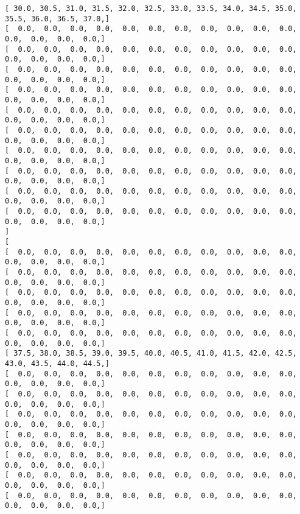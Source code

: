 \documentclass[11pt]{article}
\begin{document}
\begin{Verbatim}[commandchars=\\\{\}]
[  30.0,  30.5,  31.0,  31.5,  32.0,  32.5,  33.0,  33.5,  34.0,  34.5,  35.0,  35.5,  36.0,  36.5,  37.0, ]
[   0.0,   0.0,   0.0,   0.0,   0.0,   0.0,   0.0,   0.0,   0.0,   0.0,   0.0,   0.0,   0.0,   0.0,   0.0, ]
[   0.0,   0.0,   0.0,   0.0,   0.0,   0.0,   0.0,   0.0,   0.0,   0.0,   0.0,   0.0,   0.0,   0.0,   0.0, ]
[   0.0,   0.0,   0.0,   0.0,   0.0,   0.0,   0.0,   0.0,   0.0,   0.0,   0.0,   0.0,   0.0,   0.0,   0.0, ]
[   0.0,   0.0,   0.0,   0.0,   0.0,   0.0,   0.0,   0.0,   0.0,   0.0,   0.0,   0.0,   0.0,   0.0,   0.0, ]
[   0.0,   0.0,   0.0,   0.0,   0.0,   0.0,   0.0,   0.0,   0.0,   0.0,   0.0,   0.0,   0.0,   0.0,   0.0, ]
[   0.0,   0.0,   0.0,   0.0,   0.0,   0.0,   0.0,   0.0,   0.0,   0.0,   0.0,   0.0,   0.0,   0.0,   0.0, ]
[   0.0,   0.0,   0.0,   0.0,   0.0,   0.0,   0.0,   0.0,   0.0,   0.0,   0.0,   0.0,   0.0,   0.0,   0.0, ]
[   0.0,   0.0,   0.0,   0.0,   0.0,   0.0,   0.0,   0.0,   0.0,   0.0,   0.0,   0.0,   0.0,   0.0,   0.0, ]
[   0.0,   0.0,   0.0,   0.0,   0.0,   0.0,   0.0,   0.0,   0.0,   0.0,   0.0,   0.0,   0.0,   0.0,   0.0, ]
[   0.0,   0.0,   0.0,   0.0,   0.0,   0.0,   0.0,   0.0,   0.0,   0.0,   0.0,   0.0,   0.0,   0.0,   0.0, ]
]
[
[   0.0,   0.0,   0.0,   0.0,   0.0,   0.0,   0.0,   0.0,   0.0,   0.0,   0.0,   0.0,   0.0,   0.0,   0.0, ]
[   0.0,   0.0,   0.0,   0.0,   0.0,   0.0,   0.0,   0.0,   0.0,   0.0,   0.0,   0.0,   0.0,   0.0,   0.0, ]
[   0.0,   0.0,   0.0,   0.0,   0.0,   0.0,   0.0,   0.0,   0.0,   0.0,   0.0,   0.0,   0.0,   0.0,   0.0, ]
[   0.0,   0.0,   0.0,   0.0,   0.0,   0.0,   0.0,   0.0,   0.0,   0.0,   0.0,   0.0,   0.0,   0.0,   0.0, ]
[   0.0,   0.0,   0.0,   0.0,   0.0,   0.0,   0.0,   0.0,   0.0,   0.0,   0.0,   0.0,   0.0,   0.0,   0.0, ]
[  37.5,  38.0,  38.5,  39.0,  39.5,  40.0,  40.5,  41.0,  41.5,  42.0,  42.5,  43.0,  43.5,  44.0,  44.5, ]
[   0.0,   0.0,   0.0,   0.0,   0.0,   0.0,   0.0,   0.0,   0.0,   0.0,   0.0,   0.0,   0.0,   0.0,   0.0, ]
[   0.0,   0.0,   0.0,   0.0,   0.0,   0.0,   0.0,   0.0,   0.0,   0.0,   0.0,   0.0,   0.0,   0.0,   0.0, ]
[   0.0,   0.0,   0.0,   0.0,   0.0,   0.0,   0.0,   0.0,   0.0,   0.0,   0.0,   0.0,   0.0,   0.0,   0.0, ]
[   0.0,   0.0,   0.0,   0.0,   0.0,   0.0,   0.0,   0.0,   0.0,   0.0,   0.0,   0.0,   0.0,   0.0,   0.0, ]
[   0.0,   0.0,   0.0,   0.0,   0.0,   0.0,   0.0,   0.0,   0.0,   0.0,   0.0,   0.0,   0.0,   0.0,   0.0, ]
[   0.0,   0.0,   0.0,   0.0,   0.0,   0.0,   0.0,   0.0,   0.0,   0.0,   0.0,   0.0,   0.0,   0.0,   0.0, ]
[   0.0,   0.0,   0.0,   0.0,   0.0,   0.0,   0.0,   0.0,   0.0,   0.0,   0.0,   0.0,   0.0,   0.0,   0.0, ]

\end{Verbatim}
\end{document}
